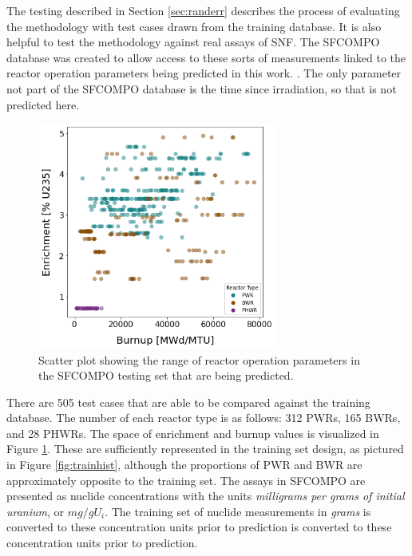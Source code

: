 

The testing described in Section \ref{sec:randerr} describes the process of
evaluating the methodology with test cases drawn from the training database.
It is also helpful to test the methodology against real assays of \gls{SNF}.
The \gls{SFCOMPO} database was created to allow access to these sorts of
measurements linked to the reactor operation parameters being predicted in this
work. \cite{sfcompo}. The only parameter not part of the \gls{SFCOMPO} database
is the time since irradiation, so that is not predicted here. 

\begin{figure}[!htb]
  \centering
  \includegraphics[width=0.7\textwidth]{./chapters/exp1/sfcompo_scatter_viz.png}
  \caption{Scatter plot showing the range of reactor operation parameters in 
           the \gls{SFCOMPO} testing set that are being predicted.}
  \label{fig:sfcoscatter}
\end{figure}

There are 505 test cases that are able to be compared against the training
database.  The number of each reactor type is as follows: 312 \gls{PWR}s, 165
\gls{BWR}s, and 28 \gls{PHWR}s. The space of enrichment and burnup values is
visualized in Figure \ref{fig:sfcoscatter}. These are sufficiently represented
in the training set design, as pictured in Figure \ref{fig:trainhist}, although
the proportions of \gls{PWR} and \gls{BWR} are approximately opposite to the
training set. The assays in \gls{SFCOMPO} are presented as nuclide
concentrations with the units \textit{milligrams per grams of initial uranium},
or $mg/gU_i$. The training set of nuclide measurements in \textit{grams} is
converted to these concentration units prior to prediction is converted to
these concentration units prior to prediction. 


